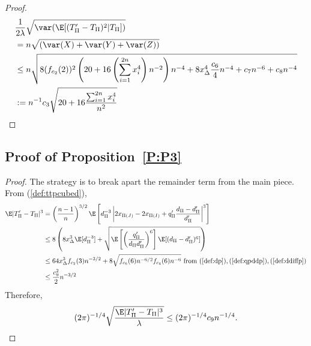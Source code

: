 \begin{proof}
  \begin{align*}
    &\frac{1}{2\lambda} \sqrt{\var (\E [(T_{\Pi}'-T_{\Pi})^2|T_{\Pi}])} \\
    &= n \sqrt{(\var(X) + \var(Y) + \var(Z))} \\
    &\leq n \sqrt{
      8(f_{c_2}(2))^2 \left ( 20 + 16 \left ( \sum_{i=1}^{2n} x_{i}^4 \right )n^{-2} \right ) n^{-4}
      + 8x_{\Delta}^4 \frac{c_6}{4} n^{-4}
      + c_7 n^{-6} + c_8 n^{-4}} \\
    &:= n^{-1} c_3\sqrt{20 + 16\frac{\sum_{i=1}^{2n} x_{i}^4}{n^2}} \\
  \end{align*}
\end{proof}

\subsection{Proof of Proposition~\ref{P:P3}}
\begin{proof}
  The strategy is to break apart the remainder term from the main piece.  From (\ref{def:ttpcubed}),
  \begin{align*}
    \E|T_{\Pi}'-T_{\Pi}|^3
    &= \left (\frac{n-1}{n}\right )^{3/2}
    \E \left [d_{\Pi}^{-3} \left |2x_{\Pi(J)}-2x_{\Pi(I)}+q_{\Pi}'\frac{d_{\Pi}-d_{\Pi}'}{d_{\Pi}'} \right |^3
    \right ] \\
    &\leq 8 \left (
      8 x_{\Delta}^3 \E [d_{\Pi}^{-3}] +
      \sqrt{\E \left [ \left ( \frac{q_{\Pi}'}{d_{\Pi}d_{\Pi}'} \right )^6 \right ]  \E
        [(d_{\Pi}-d_{\Pi}')^6]} \right ) \\
    &\leq 64 x_{\Delta}^3 f_{c_2}(3) n^{-3/2} +
    8 \sqrt{f_{c_6}(6) n^{-6/2} f_{c_4}(6) n^{-6}} \text{ from }
    (\ref{def:dp}),(\ref{def:qpddp}),(\ref{def:ddiffp}) \\
    &\leq \frac{c_9^2}{2} n^{-3/2}
  \end{align*}
  Therefore,
  \begin{equation*}
    (2\pi)^{-1/4}\sqrt{\frac{\E|T_{\Pi}'-T_{\Pi}|^3}{\lambda}} \leq
    (2\pi)^{-1/4} c_9 n^{-1/4}.
  \end{equation*}
\end{proof}

